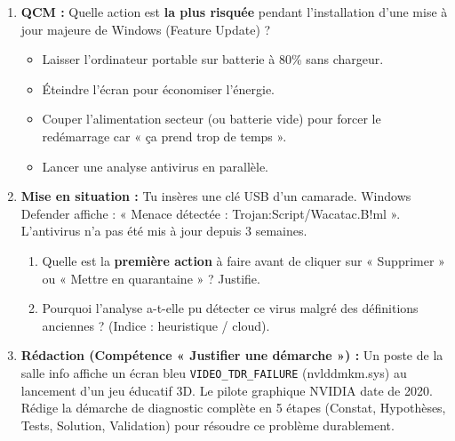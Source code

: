 \documentclass[11pt]{article}
\begin{document}
\begin{exercice}
\begin{enumerate}
    \item \textbf{QCM :} Quelle action est \textbf{la plus risquée} pendant l'installation d'une mise à jour majeure de Windows (Feature Update) ?
    \begin{itemize}
        \item[A] Laisser l'ordinateur portable sur batterie à 80\% sans chargeur.
        \item[B] Éteindre l'écran pour économiser l'énergie.
        \item[C] Couper l'alimentation secteur (ou batterie vide) pour forcer le redémarrage car « ça prend trop de temps ».
        \item[D] Lancer une analyse antivirus en parallèle.
    \end{itemize}
    \item \textbf{Mise en situation :} Tu insères une clé USB d'un camarade. Windows Defender affiche : « Menace détectée : Trojan:Script/Wacatac.B!ml ». L'antivirus n'a pas été mis à jour depuis 3 semaines.
    \begin{enumerate}
        \item Quelle est la \textbf{première action} à faire avant de cliquer sur « Supprimer » ou « Mettre en quarantaine » ? Justifie.
        \item Pourquoi l'analyse a-t-elle pu détecter ce virus malgré des définitions anciennes ? (Indice : heuristique / cloud).
    \end{enumerate}
    \item \textbf{Rédaction (Compétence « Justifier une démarche ») :} Un poste de la salle info affiche un écran bleu \texttt{VIDEO\_TDR\_FAILURE} (nvlddmkm.sys) au lancement d'un jeu éducatif 3D. Le pilote graphique NVIDIA date de 2020. Rédige la démarche de diagnostic complète en 5 étapes (Constat, Hypothèses, Tests, Solution, Validation) pour résoudre ce problème durablement.
\end{enumerate}
\end{exercice}
\end{document}
